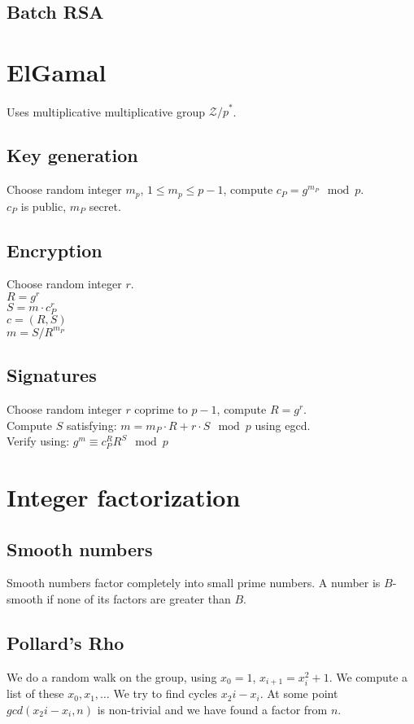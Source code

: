 \documentclass{article}
\begin{document}
\subsection{Batch RSA}

\section{ElGamal}
Uses multiplicative multiplicative group ${\mathcal{Z}/p}^{*}$.
\subsection{Key generation}
Choose random integer $m_p$, $1 \leq m_p \leq p-1$, compute $c_P=g^{m_P} \mod p$. \\
$c_P$ is public, $m_P$ secret.

\subsection{Encryption}
Choose random integer $r$. \\
$R=g^r$ \\
$S=m \cdot c_P^r$ \\
$c=(R,S)$ \\
$m=S/R^{m_P}$ \\

\subsection{Signatures}
Choose random integer $r$ coprime to $p-1$, compute $R=g^r$. \\
Compute $S$ satisfying:
$m=m_P \cdot R + r \cdot S \mod p$ 
using egcd. \\
Verify using:
$g^m \equiv c_P^R R^S \mod p$ \\

\section{Integer factorization}
\subsection{Smooth numbers}
Smooth numbers factor completely into small prime numbers. A number is $B$-smooth if none of its factors are greater than $B$.

\subsection{Pollard's Rho}
We do a random walk on the group, using $x_0=1$, $x_{i+1} = x_i^2 + 1$.
We compute a list of these ${x_0, x_1, \ldots }$
We try to find cycles $x_2i - x_i$.
At some point $gcd(x_2i - x_i, n)$ is non-trivial and we have found a factor from $n$.
\end{document}
